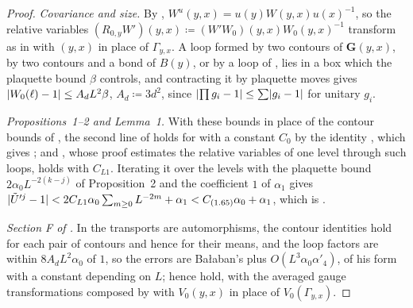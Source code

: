 \documentclass[11pt]{preprint}
\DeclarePairedDelimiter{\abs}{\lvert}{\rvert}
\numberwithin{equation}{section}
\theoremstyle{definition}
\theoremstyle{remark}
\theoremstyle{plain}
\begin{document}
\begin{proof}
\emph{Covariance and size.} By \cite[(0.6)]{BalabanRG1}, $W^u(y, x) = u(y)W(y, x)u(x)^{-1}$, so the relative variables $(R_{0,y}W')(y, x) \coloneqq (W'W_0)(y, x)W_0(y, x)^{-1}$ transform as in \cite[p.~27]{BalabanAVG} with $(y, x)$ in place of $\Gamma_{y,x}$. A loop formed by two contours of $\mathbf G(y, x)$, by two contours and a bond of $B(y)$, or by a loop of \cite[(0.4)]{BalabanRG1}, lies in a box which the plaquette bound $\beta$ controls, and contracting it by plaquette moves gives $\abs{W_0(\ell) - 1} \leq A_dL^2\beta$, $A_d \coloneqq 3d^2$, since $\abs{\prod g_i - 1} \leq \sum\abs{g_i - 1}$ for unitary $g_i$.

\emph{Propositions~1--2 and Lemma~1.} With these bounds in place of the contour bounds of \cite{BalabanAVG}, the second line of \cite[(50), p.~25]{BalabanAVG} holds for \cite[(0.4)]{BalabanRG1} with a constant $C_0$ by the identity \cite[(48)]{BalabanAVG}, which gives \cite[Propositions~1--2, (53)]{BalabanAVG}; and \cite[Lemma~1]{BalabanREG}, whose proof estimates the relative variables of one level through such loops, holds with $C_{L1}$. Iterating it over the levels with the plaquette bound $2\alpha_0L^{-2(k-j)}$ of Proposition~2 and the coefficient $1$ of $\alpha_1$ gives $\abs{\tilde U'^j - 1} < 2C_{L1}\alpha_0\sum_{m \geq 0}L^{-2m} + \alpha_1 < C_{(1.65)}\alpha_0 + \alpha_1$, which is \cite[(1.65)]{BalabanREG}.

\emph{Section F of \cite{BalabanAVG}.} In \cite[(168)--(214)]{BalabanAVG} the transports are automorphisms, the contour identities hold for each pair of contours and hence for their means, and the loop factors are within $8A_dL^2\alpha_0$ of $1$, so the errors are Ba{\l}aban's plus $O(L^3\alpha_0\alpha'_4)$, of his form with a constant depending on $L$; hence \cite[Propositions~8--10, (213)--(214)]{BalabanAVG} hold, with the averaged gauge transformations composed by \cite[(78)--(80)]{BalabanAVG} with $V_0(y, x)$ in place of $V_0(\Gamma_{y,x})$.


\end{proof}
\end{document}
